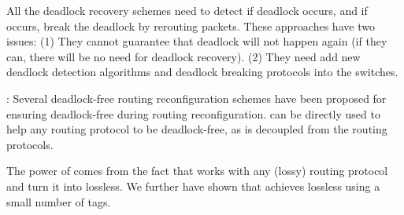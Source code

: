 All the deadlock recovery schemes
\cite{isca95,shpiner2016unlocking,venkatramani1996,martinez1997,Lopez1998}
need to detect if deadlock occurs, and if occurs, break the deadlock by
rerouting packets. These approaches have two issues: (1) They cannot
guarantee that deadlock will not happen again (if they can, there will
be no need for deadlock recovery). (2) They need add new deadlock
detection algorithms and deadlock breaking protocols into the switches.


:
Several deadlock-free routing reconfiguration schemes
\cite{automatic,lysne2005,doublescheme,gara2005} have been proposed for
ensuring deadlock-free during routing reconfiguration. \sysname{} can
be directly used to help any routing protocol to be deadlock-free, as
\sysname{} is decoupled from the routing protocols.


The power of \sysname{} comes from the fact that \sysname{} works with
any (lossy) routing protocol and turn it into lossless. We further have
shown that  \sysname{} achieves lossless using a small number of tags. 



